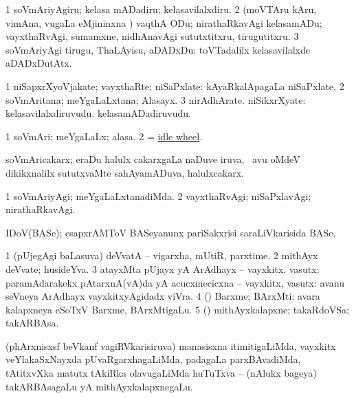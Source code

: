 \noindent
\gl{\akirx}
\bmng
\bnum
\num{1} soVmAriyAgiru; kelasa mADadiru; kelasavilalxdiru. 
\num{2} (moVTAru kAru, vimAna, \mo vugaLa eMjininxna \vi) vaqthA ODu; nirathaRkavAgi kelasamADu; vayxthaRvAgi, sumamxne, nidhAnavAgi sututxtitxru, tirugutitxru. 
\num{3} soVmAriyAgi tirugu, ThaLAyisu, aDADxDu:  toVTadalilx kelasavilalxde aDADxDutAtx. 
\enum
\emng
\eentry

\bentry
{}
\gl{\nA}
\bmng
\bnum
\num{1} niSapxrXyoVjakate; vayxthaRte; niSaPxlate:  kAyaRkalApagaLa niSaPxlate. 
\num{2} soVmAritana; meYgaLaLxtana; Alasayx. 
\num{3} nirAdhArate. 
 niSikxrXyate: 
\banum
{} kelasavilalxdiruvudu. 
 kelasamADadiruvudu. 
\eanum
\numie
\enum
\emng
\eentry

\bentry
{}
\gl{\nA}
\bmng
\bnum
\num{1} soVmAri; meYgaLaLx; alasa. 
\num{2}  = \hyperlink{idle wheel}{idle wheel}. 
\enum
\emng
\eentry

\bentry
{}
\gl{\nA}
\bmng
soVmAricakarx; eraDu halulx cakarxgaLa naDuve iruva, \kanmu\ avu oMdeV dikikxnalilx sututxvaMte sahAyamADuva, halulxcakarx.  
\emng
\eentry

\bentry
{}
\gl{\kirxvi}
\bmng
\bnum
\num{1} soVmAriyAgi; meYgaLaLxtanadiMda. 
\num{2} vayxthaRvAgi; niSaPxlavAgi; nirathaRkavAgi. 
\enum
\emng
\eentry

\bentry
{}
\gl{\nA}
\bmng
IDoV(BASe); esapxrAMToV BASeyanunx pariSakxrisi saraLiVkarisida BASe. 
\emng
\eentry

\bentry
{}
\gl{\nA}
\bmng
\bnum
\num{1} (pUjegAgi baLasuva) deVvatA -- vigarxha, mUtiR, parxtime. 
\num{2} mithAyx deVvate; husideYva. 
\num{3} atayxMta pUjayx yA ArAdhayx -- vayxkitx, vasutx; paramAdarakekx pAtarxnA(vA)da yA acucxmecicxna -- vayxkitx, vasutx:  avanu seVneya ArAdhayx vayxkitxyAgidadx viVra. 
\num{4} (\pArxparx) Barxme; BArxMti:  avara kalapxneya eSoTxV Barxme, BArxMtigaLu. 
\num{5} (\takaR) mithAyxkalapxne; takaRdoVSa; takARBAsa. 
\enum
\emng

\noindent
\gl{\pagu}
\bmng
{}  (phArxnisxsf beVkanf vagiRVkarisiruva) manasisxna itimitigaLiMda, vayxkitx veYlakaSxNayxda pUvaRgarxhagaLiMda, padagaLa parxBAvadiMda, tAtitxvXka matutx tAkiRka olavugaLiMda huTuTxva -- (nAlukx bageya) takARBAsagaLu yA mithAyxkalapxnegaLu. 
\emng
\eentry

